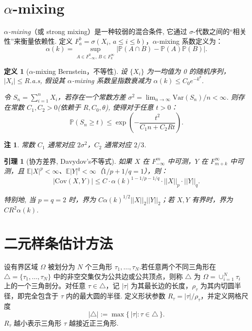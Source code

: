\documentclass[a4paper,openay,14pt]{ctexbook}
\numberwithin{equation}{section}
\numberwithin{lem}{section}
\newtheorem{lemma}[theorem]{引理}%
\newtheorem{definition}[theorem]{定义}%
\newtheorem{rema}[theorem]{注}%
\begin{document}
\section{$\alpha$-mixing}
\textit{$\alpha$-mixing}（或 strong mixing）是一种较弱的混合条件, 它通过 $\sigma$-代数之间的“相关性”来衡量依赖性.
定义 $F_a^b = \sigma(X_i,\, a \le i \le b)$，$\alpha$-mixing 系数定义为：
\[
\alpha(k) = \sup_{A\in F_{-\infty}^0,\, B\in F_k^\infty} \bigl| \mathbb{P}(A\cap B) - \mathbb{P}(A)\mathbb{P}(B) \bigr|.
\]

\begin{definition}[{$\alpha$-mixing Bernstein，不等性}]
设 $\{X_i\}$ 为一均值为 0 的随机序列，$|X_i| \le R$.a.s, 假设其 $\alpha$-mixing 系数呈指数衰减为
$\alpha(k) \le C_0 e^{-k^\theta}$.

令 $S_n = \sum_{i=1}^n X_i$，若存在一个常数方差 $\sigma^2 = \lim_{n\to\infty}\mathrm{Var}(S_n)/n < \infty$. 则存在常数
$C_1, C_2 > 0$(依赖于 $R, C_0, \theta$), 使得对于任意 $t>0$：
\[
\mathbb{P}(S_n \ge t) \le \exp\left( - \frac{t^2}{C_1 n + C_2 R t} \right).
\]

\end{definition}

\begin{rema}
    常数 $C_1$ 通常对应 $2\sigma^2$，$C_2$ 通常对应 $2/3$.
\end{rema}


\begin{lemma}[协方差界, Davydov's不等式]
如果 $X$ 在 $F_{-\infty}^m$ 中可测，$Y$ 在 $F_{m+k}^\infty$ 中可测，且 $\mathbb{E}|X|^p < \infty$、$\mathbb{E}|Y|^q < \infty$（$1/p + 1/q = 1$），则：
$$|\mathrm{Cov}(X,Y)| \le C \cdot \alpha(k)^{1 - 1/p - 1/q} \cdot || X ||_p \cdot ||Y||_q.$$

特别地, 当 $p = q = 2$ 时，界为 $C \alpha(k)^{1/2} ||X||_2 ||Y||_2$；若 $X,Y$ 有界时，界为 $CR^2\alpha(k)$.
\end{lemma}



\section{二元样条估计方法}\label{BST}

设有界区域 $\Omega$ 被划分为 $N$ 个三角形 $\tau_{1},\ldots,\tau_{N}$.若任意两个不同三角形在 $\triangle=\{\tau_{1},\ldots,\tau_{N}\}$ 中的非空交集仅为公共边或公共顶点，则称 $\triangle$ 为 $\Omega=\cup_{i=1}^N \tau_i$ 上的一个三角剖分。对任意 $\tau\in\triangle$，记 $|\tau|$ 为其最长边的长度，$\rho_\tau$ 为其内切圆半径，即完全包含于 $\tau$ 内的最大圆的半径. 定义形状参数 $R_\tau=|\tau|/\rho_\tau$，并定义网格尺度
\[
|\triangle|:=\max\{\,|\tau|:\tau\in\triangle\,\}.
\]
$R_\tau$ 越小表示三角形 $\tau$ 越接近正三角形.
\end{document}
